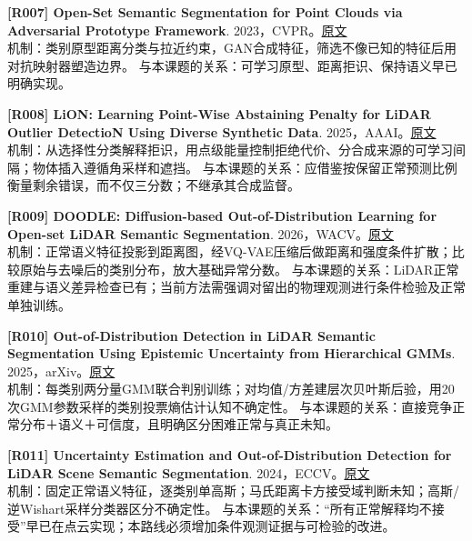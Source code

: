 \documentclass[11pt,a4paper]{article}
\begin{document}
\hypertarget{R007}{}\textbf{[R007] Open-Set Semantic Segmentation for Point Clouds via Adversarial Prototype Framework}. 2023，CVPR。\href{https://openaccess.thecvf.com/content/CVPR2023/papers/Li_Open-Set_Semantic_Segmentation_for_Point_Clouds_via_Adversarial_Prototype_Framework_CVPR_2023_paper.pdf}{原文}\\
机制：类别原型距离分类与拉近约束，GAN合成特征，筛选不像已知的特征后用对抗映射器塑造边界。 与本课题的关系：可学习原型、距离拒识、保持语义早已明确实现。\par\medskip
\hypertarget{R008}{}\textbf{[R008] LiON: Learning Point-Wise Abstaining Penalty for LiDAR Outlier DetectioN Using Diverse Synthetic Data}. 2025，AAAI。\href{https://arxiv.org/html/2309.10230v3}{原文}\\
机制：从选择性分类解释拒识，用点级能量控制拒绝代价、分合成来源的可学习间隔；物体插入遵循角采样和遮挡。 与本课题的关系：应借鉴按保留正常预测比例衡量剩余错误，而不仅三分数；不继承其合成监督。\par\medskip
\hypertarget{R009}{}\textbf{[R009] DOODLE: Diffusion-based Out-of-Distribution Learning for Open-set LiDAR Semantic Segmentation}. 2026，WACV。\href{https://openaccess.thecvf.com/content/WACV2026/papers/Oh_DOODLE_Diffusion-based_Out-of-Distribution_Learning_for_Open-set_LiDAR_Semantic_Segmentation_WACV_2026_paper.pdf}{原文}\\
机制：正常语义特征投影到距离图，经VQ-VAE压缩后做距离和强度条件扩散；比较原始与去噪后的类别分布，放大基础异常分数。 与本课题的关系：LiDAR正常重建与语义差异检查已有；当前方法需强调对留出的物理观测进行条件检验及正常单独训练。\par\medskip
\hypertarget{R010}{}\textbf{[R010] Out-of-Distribution Detection in LiDAR Semantic Segmentation Using Epistemic Uncertainty from Hierarchical GMMs}. 2025，arXiv。\href{https://arxiv.org/html/2510.08631}{原文}\\
机制：每类别两分量GMM联合判别训练；对均值/方差建层次贝叶斯后验，用20次GMM参数采样的类别投票熵估计认知不确定性。 与本课题的关系：直接竞争正常分布＋语义＋可信度，且明确区分困难正常与真正未知。\par\medskip
\hypertarget{R011}{}\textbf{[R011] Uncertainty Estimation and Out-of-Distribution Detection for LiDAR Scene Semantic Segmentation}. 2024，ECCV。\href{https://arxiv.org/html/2410.08687}{原文}\\
机制：固定正常语义特征，逐类别单高斯；马氏距离卡方接受域判断未知；高斯/逆Wishart采样分类器区分不确定性。 与本课题的关系：“所有正常解释均不接受”早已在点云实现；本路线必须增加条件观测证据与可检验的改进。\par\medskip
\end{document}
